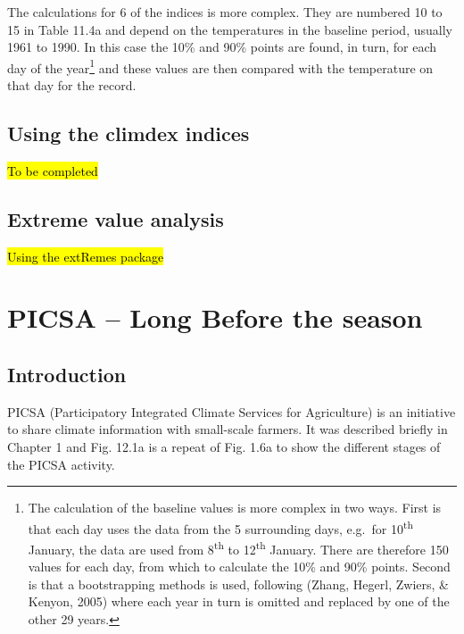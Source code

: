 \documentclass[
  letterpaper,
  DIV=11,
  numbers=noendperiod]{scrreprt}
\begin{document}
The calculations for 6 of the indices is more complex. They are numbered
10 to 15 in Table 11.4a and depend on the temperatures in the baseline
period, usually 1961 to 1990. In this case the 10\% and 90\% points are
found, in turn, for each day of the year\footnote{The calculation of the
  baseline values is more complex in two ways. First is that each day
  uses the data from the 5 surrounding days, e.g.~for
  10\textsuperscript{th} January, the data are used from
  8\textsuperscript{th} to 12\textsuperscript{th} January. There are
  therefore 150 values for each day, from which to calculate the 10\%
  and 90\% points. Second is that a bootstrapping methods is used,
  following (Zhang, Hegerl, Zwiers, \& Kenyon, 2005) where each year in
  turn is omitted and replaced by one of the other 29 years.} and these
values are then compared with the temperature on that day for the
record.

\section{Using the climdex indices}\label{using-the-climdex-indices}

\hl{To be completed}

\section{Extreme value analysis}\label{extreme-value-analysis}

\hl{Using the extRemes package}


\chapter{PICSA -- Long Before the
season}\label{picsa-long-before-the-season}

\section{Introduction}\label{introduction-11}

PICSA (Participatory Integrated Climate Services for Agriculture) is an
initiative to share climate information with small-scale farmers. It was
described briefly in Chapter 1 and Fig. 12.1a is a repeat of Fig. 1.6a
to show the different stages of the PICSA activity.
\end{document}
